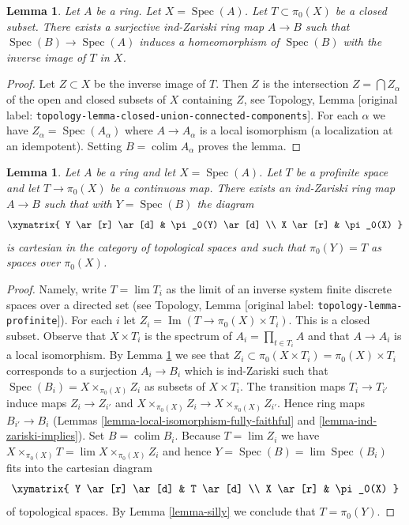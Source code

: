 \documentclass[10pt,a4paper]{article}
\theoremstyle{plain}
\newtheorem{lemma}[subsection]{Lemma}
\theoremstyle{definition}
\theoremstyle{remark}
\numberwithin{equation}{subsection}
\def\lim{\mathop{\mathrm{lim}}\nolimits}
\def\colim{\mathop{\mathrm{colim}}\nolimits}
\def\Spec{\mathop{\mathrm{Spec}}}
\def\Im{\mathop{\mathrm{Im}}}
\begin{document}
\begin{lemma}
\label{lemma-construct}
Let $A$ be a ring. Let $X = \Spec(A)$. Let $T \subset \pi_0(X)$ be a
closed subset. There exists a surjective ind-Zariski ring map $A \to B$
such that $\Spec(B) \to \Spec(A)$ induces a homeomorphism of $\Spec(B)$
with the inverse image of $T$ in $X$.
\end{lemma}

\begin{proof}
Let $Z \subset X$ be the inverse image of $T$. Then $Z$ is the intersection
$Z = \bigcap Z_\alpha$ of the open and closed subsets of $X$ containing $Z$,
see Topology, Lemma \textnormal{[original label: \nolinkurl{topology-lemma-closed-union-connected-components}]}.
For each $\alpha$ we have $Z_\alpha = \Spec(A_\alpha)$ where
$A \to A_\alpha$ is a local isomorphism (a localization at an idempotent).
Setting $B = \colim A_\alpha$ proves the lemma.
\end{proof}

\begin{lemma}
\label{lemma-construct-profinite}
Let $A$ be a ring and let $X = \Spec(A)$. Let $T$ be a profinite space and
let $T \to \pi_0(X)$ be a continuous map. There exists an
ind-Zariski ring map $A \to B$ such that with $Y = \Spec(B)$ the diagram
$$
\xymatrix{
Y \ar[r] \ar[d] & \pi_0(Y) \ar[d] \\
X \ar[r] & \pi_0(X)
}
$$
is cartesian in the category of topological spaces and such that
$\pi_0(Y) = T$ as spaces over $\pi_0(X)$.
\end{lemma}

\begin{proof}
Namely, write $T = \lim T_i$ as the limit of an inverse system finite
discrete spaces over a directed set (see
Topology, Lemma \textnormal{[original label: \nolinkurl{topology-lemma-profinite}]}). For each $i$ let
$Z_i = \Im(T \to \pi_0(X) \times T_i)$. This is a closed subset.
Observe that $X \times T_i$ is the spectrum of $A_i = \prod_{t \in T_i} A$
and that $A \to A_i$ is a local isomorphism. By Lemma \ref{lemma-construct}
we see that $Z_i \subset \pi_0(X \times T_i) = \pi_0(X) \times T_i$
corresponds to a surjection $A_i \to B_i$ which is ind-Zariski
such that $\Spec(B_i) = X \times_{\pi_0(X)} Z_i$ as subsets of
$X \times T_i$. The transition maps $T_i \to T_{i'}$ induce maps
$Z_i \to Z_{i'}$ and $X \times_{\pi_0(X)} Z_i \to X \times_{\pi_0(X)} Z_{i'}$.
Hence ring maps $B_{i'} \to B_i$
(Lemmas \ref{lemma-local-isomorphism-fully-faithful} and
\ref{lemma-ind-zariski-implies}).
Set $B = \colim B_i$. Because $T = \lim Z_i$ we have
$X \times_{\pi_0(X)} T = \lim  X \times_{\pi_0(X)} Z_i$
and hence $Y = \Spec(B) = \lim \Spec(B_i)$
fits into the cartesian diagram
$$
\xymatrix{
Y \ar[r] \ar[d] & T \ar[d] \\
X \ar[r] & \pi_0(X)
}
$$
of topological spaces. By Lemma \ref{lemma-silly}
we conclude that $T = \pi_0(Y)$.
\end{proof}
\end{document}
